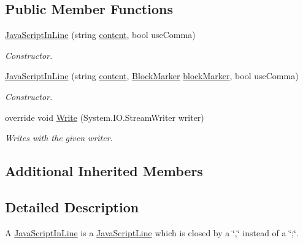 \subsection*{Public Member Functions}
\begin{DoxyCompactItemize}
\item 
\hyperlink{class_a_rdev_kit_1_1_model_1_1_project_1_1_file_1_1_java_script_in_line_a53ee897c8818a8a6da87860ed4de245f}{Java\-Script\-In\-Line} (string \hyperlink{class_a_rdev_kit_1_1_model_1_1_project_1_1_file_1_1_java_script_line_ac13eaaa9582b295e64a38594f11abb6e}{content}, bool use\-Comma)
\begin{DoxyCompactList}\small\item\em Constructor. \end{DoxyCompactList}\item 
\hyperlink{class_a_rdev_kit_1_1_model_1_1_project_1_1_file_1_1_java_script_in_line_a0bda60059c507dd0d88feeb31d6f6a4d}{Java\-Script\-In\-Line} (string \hyperlink{class_a_rdev_kit_1_1_model_1_1_project_1_1_file_1_1_java_script_line_ac13eaaa9582b295e64a38594f11abb6e}{content}, \hyperlink{class_a_rdev_kit_1_1_model_1_1_project_1_1_file_1_1_block_marker}{Block\-Marker} \hyperlink{class_a_rdev_kit_1_1_model_1_1_project_1_1_file_1_1_abstract_block_a0975ceb65947c7370dcb6565677e9d0e}{block\-Marker}, bool use\-Comma)
\begin{DoxyCompactList}\small\item\em Constructor. \end{DoxyCompactList}\item 
override void \hyperlink{class_a_rdev_kit_1_1_model_1_1_project_1_1_file_1_1_java_script_in_line_a49f0664d2621cc8d5e0589c202c19b10}{Write} (System.\-I\-O.\-Stream\-Writer writer)
\begin{DoxyCompactList}\small\item\em Writes with the given writer. \end{DoxyCompactList}\end{DoxyCompactItemize}
\subsection*{Additional Inherited Members}


\subsection{Detailed Description}
A \hyperlink{class_a_rdev_kit_1_1_model_1_1_project_1_1_file_1_1_java_script_in_line}{Java\-Script\-In\-Line} is a \hyperlink{class_a_rdev_kit_1_1_model_1_1_project_1_1_file_1_1_java_script_line}{Java\-Script\-Line} which is closed by a \char`\"{},\char`\"{} instead of a \char`\"{};\char`\"{}. 



